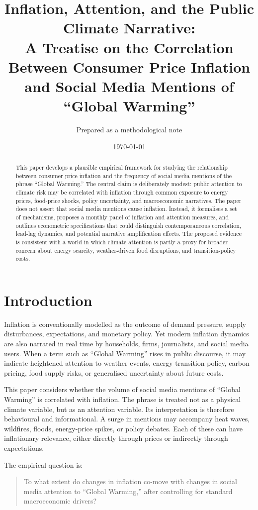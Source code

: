 \documentclass[12pt]{article}
\title{Inflation, Attention, and the Public Climate Narrative:\\
A Treatise on the Correlation Between Consumer Price Inflation and Social Media Mentions of ``Global Warming''}
\author{Prepared as a methodological note}
\date{\today}
\begin{document}
\maketitle

\begin{abstract}
This paper develops a plausible empirical framework for studying the relationship between consumer price inflation and the frequency of social media mentions of the phrase ``Global Warming.'' The central claim is deliberately modest: public attention to climate risk may be correlated with inflation through common exposure to energy prices, food-price shocks, policy uncertainty, and macroeconomic narratives. The paper does not assert that social media mentions cause inflation. Instead, it formalises a set of mechanisms, proposes a monthly panel of inflation and attention measures, and outlines econometric specifications that could distinguish contemporaneous correlation, lead-lag dynamics, and potential narrative amplification effects. The proposed evidence is consistent with a world in which climate attention is partly a proxy for broader concern about energy scarcity, weather-driven food disruptions, and transition-policy costs.
\end{abstract}

\section{Introduction}

Inflation is conventionally modelled as the outcome of demand pressure, supply disturbances, expectations, and monetary policy. Yet modern inflation dynamics are also narrated in real time by households, firms, journalists, and social media users. When a term such as ``Global Warming'' rises in public discourse, it may indicate heightened attention to weather events, energy transition policy, carbon pricing, food supply risks, or generalised uncertainty about future costs.

This paper considers whether the volume of social media mentions of ``Global Warming'' is correlated with inflation. The phrase is treated not as a physical climate variable, but as an attention variable. Its interpretation is therefore behavioural and informational. A surge in mentions may accompany heat waves, wildfires, floods, energy-price spikes, or policy debates. Each of these can have inflationary relevance, either directly through prices or indirectly through expectations.

The empirical question is:
\begin{quote}
To what extent do changes in inflation co-move with changes in social media attention to ``Global Warming,'' after controlling for standard macroeconomic drivers?
\end{quote}
\end{document}
